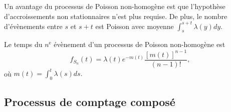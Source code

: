 
Un avantage du processus de Poisson non-homogène est que l'hypothèse d'accroissements non stationnaires n'est plus requise. De plus, le nombre d'évènements entre $s$ et $s + t$ est Poisson avec moyenne $\int_{s}^{s+ t}\lambda(y) dy.$

\begin{definition}{}{}
	Le temps du $n^\text{e}$ évènement d'un processus de Poisson non-homogène est 
	$$f_{S_n}(t)= \lambda(t) e^{-m(t)}\frac{[m(t)]^{n-1}}{(n-1)!},$$
	où $m(t) = \int_{0}^{t}\lambda(s) ds.$
\end{definition}

\subsection{Processus de comptage composé}














































































































